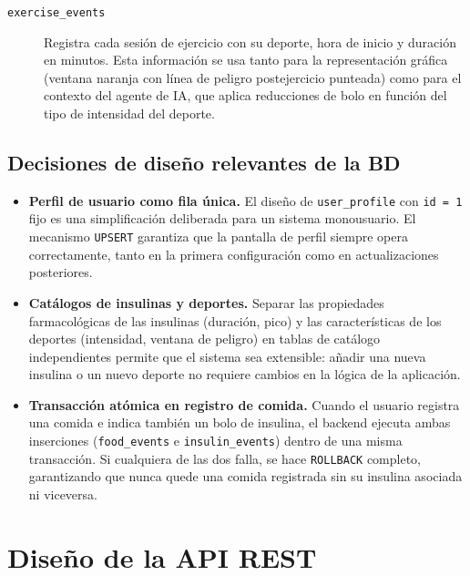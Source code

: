 \begin{description}
    \item[\texttt{exercise\_events}] Registra cada sesión de ejercicio con su
    deporte, hora de inicio y duración en minutos. Esta información se usa tanto
    para la representación gráfica (ventana naranja con línea de peligro
    postejercicio punteada) como para el contexto del agente de IA, que aplica
    reducciones de bolo en función del tipo de intensidad del deporte.
\end{description}

\subsection{Decisiones de diseño relevantes de la BD}
\label{subsec:decisiones-bd}

\begin{itemize}
    \item \textbf{Perfil de usuario como fila única.} El diseño de \texttt{user\_profile}
          con \texttt{id = 1} fijo es una simplificación deliberada para un sistema
          monousuario. El mecanismo \texttt{UPSERT} garantiza que la pantalla de perfil
          siempre opera correctamente, tanto en la primera configuración como en
          actualizaciones posteriores.

    \item \textbf{Catálogos de insulinas y deportes.} Separar las propiedades
          farmacológicas de las insulinas (duración, pico) y las características de los
          deportes (intensidad, ventana de peligro) en tablas de catálogo independientes
          permite que el sistema sea extensible: añadir una nueva insulina o un nuevo
          deporte no requiere cambios en la lógica de la aplicación.

    \item \textbf{Transacción atómica en registro de comida.} Cuando el usuario
          registra una comida e indica también un bolo de insulina, el backend ejecuta
          ambas inserciones (\texttt{food\_events} e \texttt{insulin\_events}) dentro
          de una misma transacción. Si cualquiera de las dos falla, se hace
          \texttt{ROLLBACK} completo, garantizando que nunca quede una comida registrada
          sin su insulina asociada ni viceversa.
\end{itemize}

\section{Diseño de la API REST}
\label{sec:diseno-api}

